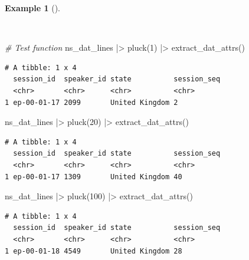 \documentclass[
  letterpaper,
]{book}
\newenvironment{Shaded}{\begin{snugshade}}{\end{snugshade}}
\newcommand{\CommentTok}[1]{\textcolor[rgb]{0.00,0.00,0.00}{\textit{#1}}}
\newcommand{\DecValTok}[1]{\textcolor[rgb]{0.00,0.00,0.00}{#1}}
\newcommand{\FunctionTok}[1]{\textcolor[rgb]{0.00,0.00,0.00}{#1}}
\newcommand{\NormalTok}[1]{\textcolor[rgb]{0.00,0.00,0.00}{#1}}
\newcommand{\SpecialCharTok}[1]{\textcolor[rgb]{0.00,0.00,0.00}{#1}}
\theoremstyle{definition}
\newtheorem{example}{Example}[chapter]
\theoremstyle{remark}
\begin{document}
\begin{example}[]\protect\hypertarget{exm-curate-enntt-test-extract-attributes-function}{}\label{exm-curate-enntt-test-extract-attributes-function}

~

\begin{Shaded}
\begin{Highlighting}[]
\CommentTok{\# Test function}
\NormalTok{ns\_dat\_lines }\SpecialCharTok{|\textgreater{}} \FunctionTok{pluck}\NormalTok{(}\DecValTok{1}\NormalTok{) }\SpecialCharTok{|\textgreater{}} \FunctionTok{extract\_dat\_attrs}\NormalTok{()}
\end{Highlighting}
\end{Shaded}

\begin{verbatim}
# A tibble: 1 x 4
  session_id  speaker_id state          session_seq
  <chr>       <chr>      <chr>          <chr>      
1 ep-00-01-17 2099       United Kingdom 2          
\end{verbatim}

\begin{Shaded}
\begin{Highlighting}[]
\NormalTok{ns\_dat\_lines }\SpecialCharTok{|\textgreater{}} \FunctionTok{pluck}\NormalTok{(}\DecValTok{20}\NormalTok{) }\SpecialCharTok{|\textgreater{}} \FunctionTok{extract\_dat\_attrs}\NormalTok{()}
\end{Highlighting}
\end{Shaded}

\begin{verbatim}
# A tibble: 1 x 4
  session_id  speaker_id state          session_seq
  <chr>       <chr>      <chr>          <chr>      
1 ep-00-01-17 1309       United Kingdom 40         
\end{verbatim}

\begin{Shaded}
\begin{Highlighting}[]
\NormalTok{ns\_dat\_lines }\SpecialCharTok{|\textgreater{}} \FunctionTok{pluck}\NormalTok{(}\DecValTok{100}\NormalTok{) }\SpecialCharTok{|\textgreater{}} \FunctionTok{extract\_dat\_attrs}\NormalTok{()}
\end{Highlighting}
\end{Shaded}

\begin{verbatim}
# A tibble: 1 x 4
  session_id  speaker_id state          session_seq
  <chr>       <chr>      <chr>          <chr>      
1 ep-00-01-18 4549       United Kingdom 28         
\end{verbatim}

\end{example}
\end{document}
